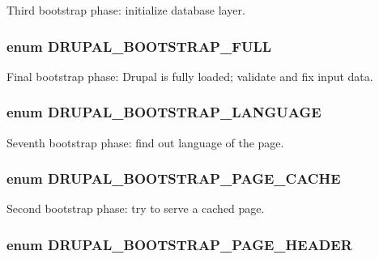 \label{bootstrap_8inc_a693d842eaaf448b1e6c37cc4ef068e3a}
Third bootstrap phase: initialize database layer. \hypertarget{bootstrap_8inc_a2c8ac509af1924cf2fa7420a22e1b048}{
\subsubsection[{DRUPAL\_\-BOOTSTRAP\_\-FULL}]{\setlength{\rightskip}{0pt plus 5cm}enum {\bf DRUPAL\_\-BOOTSTRAP\_\-FULL}}}
\label{bootstrap_8inc_a2c8ac509af1924cf2fa7420a22e1b048}
Final bootstrap phase: Drupal is fully loaded; validate and fix input data. \hypertarget{bootstrap_8inc_ae4a0a1bc1243082285abc3fc052e5d38}{
\subsubsection[{DRUPAL\_\-BOOTSTRAP\_\-LANGUAGE}]{\setlength{\rightskip}{0pt plus 5cm}enum {\bf DRUPAL\_\-BOOTSTRAP\_\-LANGUAGE}}}
\label{bootstrap_8inc_ae4a0a1bc1243082285abc3fc052e5d38}
Seventh bootstrap phase: find out language of the page. \hypertarget{bootstrap_8inc_a72f3a79e7308050a8f4d074592314c0f}{
\subsubsection[{DRUPAL\_\-BOOTSTRAP\_\-PAGE\_\-CACHE}]{\setlength{\rightskip}{0pt plus 5cm}enum {\bf DRUPAL\_\-BOOTSTRAP\_\-PAGE\_\-CACHE}}}
\label{bootstrap_8inc_a72f3a79e7308050a8f4d074592314c0f}
Second bootstrap phase: try to serve a cached page. \hypertarget{bootstrap_8inc_aa237aa5f95f8059a465efef6c72e49ce}{
\subsubsection[{DRUPAL\_\-BOOTSTRAP\_\-PAGE\_\-HEADER}]{\setlength{\rightskip}{0pt plus 5cm}enum {\bf DRUPAL\_\-BOOTSTRAP\_\-PAGE\_\-HEADER}}}

